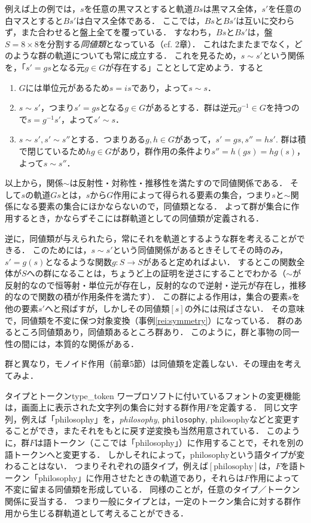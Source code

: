 \documentclass[11pt,a4paper]{jsarticle}
\begin{document}
例えば上の例では，$s$を任意の黒マスとすると軌道$Bs$は黒マス全体，$s'$を任意の白マスとすると$Bs'$は白マス全体である．
ここでは，$Bs$と$Bs'$は互いに交わらず，また合わせると盤上全てを覆っている．
すなわち，$Bs$と$Bs'$は，盤$S = 8 \times 8$を分割する\emph{同値類}となっている（cf. 2章）．
これはたまたまでなく，どのような群の軌道についても常に成立する．
これを見るため，$s \sim s'$という関係を，「$s' = gs$となる元$g \in G$が存在する」こととして定めよう．すると
\begin{enumerate}
 \item $G$には単位元があるため$s = is$であり，よって$s \sim s$．
 \item $s \sim s'$，つまり$s' = gs$となる$g \in G$があるとする．群は逆元$g^{-1} \in G$を持つので$s = g^{-1}s'$，よって$s' \sim s$．
 \item $s \sim s', s' \sim s''$とする．つまりある$g, h \in G$があって，$s' = gs, s'' = hs'$. 
       群は積で閉じているため$hg \in G$があり，群作用の条件より$s'' = h(gs) = hg(s)$，よって$s \sim s''$．
\end{enumerate}
以上から，関係$\sim$は反射性・対称性・推移性を満たすので同値関係である．
そして$s$の軌道$Gs$とは，$s$から$G$作用によって得られる要素の集合，つまり$s$と$\sim$関係になる要素の集合にほかならないので，同値類となる．
よって群が集合に作用するとき，かならずそこには群軌道としての同値類が定義される．

逆に，同値類が与えられたら，常にそれを軌道とするような群を考えることができる．
このためには，$s \sim s'$という同値関係があるときそしてその時のみ，$s' = g(s)$となるような関数$g:S \to S$があると定めればよい．
するとこの関数全体が$S$への群になることは，ちょうど上の証明を逆さにすることでわかる（$\sim$が反射的なので恒等射・単位元が存在し，反射的なので逆射・逆元が存在し，推移的なので関数の積が作用条件を満たす）．
この群による作用は，集合の要素$s$を他の要素$s'$へと飛ばすが，しかしその同値類$[s]$の外には飛ばさない．
その意味で，同値類を不変に保つ対象変換（事例\ref{rei:symmetry}）になっている．
群のあるところ同値類あり，同値類あるところ群あり．
このように，群と事物の同一性の間には，本質的な関係がある．

\begin{renshu}{}{}
 群と異なり，モノイド作用（前章5節）は同値類を定義しない．その理由を考えてみよ．
\end{renshu}

\begin{rei}{タイプとトークン}{type_token}
ワープロソフトに付いているフォントの変更機能は，画面上に表示された文字列の集合に対する群作用$F$を定義する．
同じ文字列，例えば「philosophy」を，\textit{philosophy}, \texttt{philosophy}, \textsf{philosophy}などと変更することができ，またそれをもとに戻す逆変換も当然用意されている．
このように，群$F$は語トークン（ここでは「philosophy」）に作用することで，それを別の語トークンへと変更する．
しかしそれによって，philosophyという語タイプが変わることはない．
つまりそれぞれの語タイプ，例えば$[\text{philosophy}]$は，$F$を語トークン「philosophy」に作用させたときの軌道であり，それらは$F$作用によって不変に留まる同値類を形成している．
同様のことが，任意のタイプ／トークン関係に妥当する．
つまり一般にタイプとは，一定のトークン集合に対する群作用から生じる群軌道として考えることができる．
\end{rei}
\end{document}
